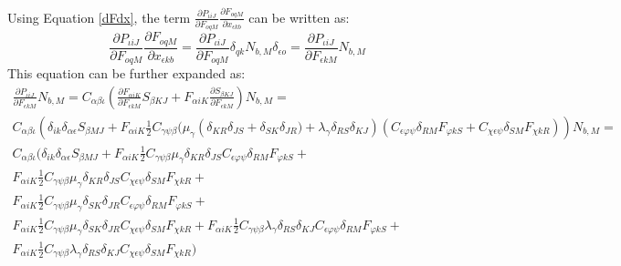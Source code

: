 \documentclass[oneside,11pt,times]{book}
\newcommand\omicron{o}
\begin{document}
Using Equation \eqref{dFdx}, the term $\frac{\partial P_{ \iota i J}}{\partial F_{ \omicron qM}} \frac{\partial F_{ \omicron qM}}{\partial x_{ \epsilon kb}}$ can be written as:
\begin{equation}
\frac{\partial P_{ \iota  iJ}}{\partial F_{ \omicron qM}} \frac{\partial F_{ \omicron qM}}{\partial x_{ \epsilon kb}} = \frac{\partial P_{ \iota iJ}}{\partial F_{ \omicron qM}} \delta_{qk}N_{b,M} \delta_{\epsilon \omicron} = \frac{\partial P_{ \iota iJ}}{\partial F_{ \epsilon kM}} N_{b,M}
\end{equation}
This equation can be further expanded as:
\begin{equation}
\label{tanMod}
    \begin{gathered}
 \frac{\partial P_{ \iota iJ}}{\partial F_{ \epsilon kM}} N_{b,M} = C_{\alpha \beta \iota} (\frac{\partial F_{ \alpha iK}}{\partial F_{ \epsilon kM}} S_{ \beta KJ} + F_{ \alpha iK} \frac{\partial S_{ \beta KJ}}{\partial F_{ \epsilon kM}})N_{b,M}  = \\
 C_{\alpha \beta \iota}\left(\delta_{ik} \delta_{\alpha \epsilon} S_{ \beta MJ} + F_{ \alpha iK} \frac{1}{2}C_{\gamma \psi \beta} (\mu_{\gamma}\left(\delta_{KR}\delta_{JS} + \delta_{SK}\delta_{JR}) + \lambda_{\gamma} \delta_{RS}\delta_{KJ}\right)\left(C_{\epsilon \varphi \psi}\delta_{RM} F_{ \varphi kS} + C_{\chi \epsilon \psi}\delta_{SM}F_{ \chi kR}\right)\right)N_{b,M} =
 \\
 C_{\alpha \beta \iota}(\delta_{ik} \delta_{\alpha \epsilon} S_{ \beta MJ} +   F_{ \alpha iK} \frac{1}{2}C_{\gamma \psi \beta} \mu_{\gamma}\delta_{KR}\delta_{JS}C_{\epsilon \varphi \psi}\delta_{RM} F_{ \varphi kS} + \\ F_{ \alpha iK} \frac{1}{2}C_{\gamma \psi \beta} \mu_{\gamma}\delta_{KR}\delta_{JS} C_{\chi \epsilon \psi}\delta_{SM}F_{ \chi kR} + \\ F_{ \alpha iK} \frac{1}{2}C_{\gamma \psi \beta} \mu_{\gamma}\delta_{SK}\delta_{JR}C_{\epsilon \varphi \psi}\delta_{RM} F_{ \varphi kS} + \\ F_{ \alpha iK} \frac{1}{2}C_{\gamma \psi \beta} \mu_{\gamma}\delta_{SK}\delta_{JR} C_{\chi \epsilon \psi}\delta_{SM}F_{ \chi kR} + F_{ \alpha iK} \frac{1}{2}C_{\gamma \psi \beta}\lambda_{\gamma} \delta_{RS}\delta_{KJ}C_{\epsilon \varphi \psi}\delta_{RM} F_{ \varphi kS} + \\ F_{ \alpha iK} \frac{1}{2}C_{\gamma \psi \beta}\lambda_{\gamma} \delta_{RS}\delta_{KJ}C_{\chi \epsilon \psi}\delta_{SM}F_{ \chi kR})
  \end{gathered}
\end{equation}
\end{document}
